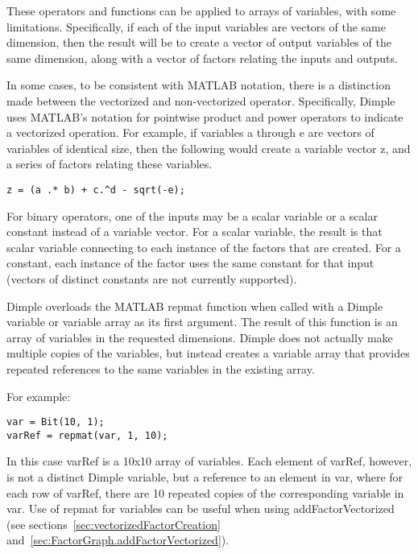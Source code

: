 These operators and functions can be applied to arrays of variables, with some limitations.  Specifically, if each of the input variables are vectors of the same dimension, then the result will be to create a vector of output variables of the same dimension, along with a vector of factors relating the inputs and outputs.

In some cases, to be consistent with MATLAB notation, there is a distinction made between the vectorized and non-vectorized operator.  Specifically, Dimple uses MATLAB's notation for pointwise product and power operators to indicate a vectorized operation.  For example, if variables a through e are vectors of variables of identical size, then the following would create a variable vector z, and a series of factors relating these variables.

\begin{lstlisting}
z = (a .* b) + c.^d - sqrt(-e);
\end{lstlisting}

For binary operators, one of the inputs may be a scalar variable or a scalar constant instead of a variable vector.  For a scalar variable, the result is that scalar variable connecting to each instance of the factors that are created.  For a constant, each instance of the factor uses the same constant for that input (vectors of distinct constants are not currently supported).


Dimple overloads the MATLAB repmat function when called with a Dimple variable or variable array as its first argument.  The result of this function is an array of variables in the requested dimensions.  Dimple does not actually make multiple copies of the variables, but instead creates a variable array that provides repeated references to the same variables in the existing array.  

For example:
\begin{lstlisting}
var = Bit(10, 1);
varRef = repmat(var, 1, 10);
\end{lstlisting}

In this case varRef is a 10x10 array of variables.  Each element of varRef, however, is not a distinct Dimple variable, but a reference to an element in var, where for each row of varRef, there are 10 repeated copies of the corresponding variable in var.  Use of repmat for variables can be useful when using addFactorVectorized (see sections~\ref{sec:vectorizedFactorCreation} and~\ref{sec:FactorGraph.addFactorVectorized}).

